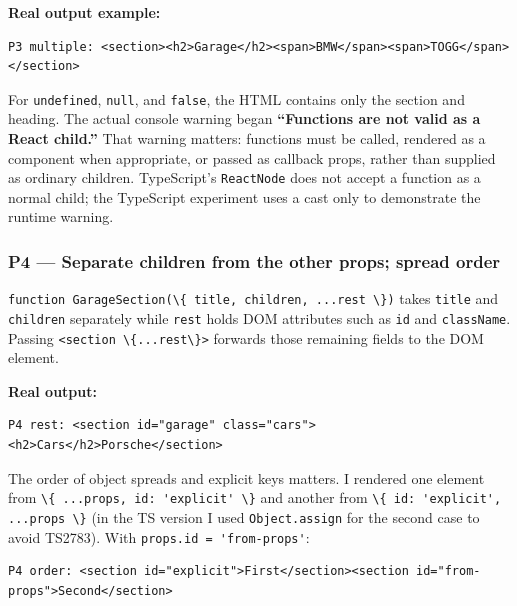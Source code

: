 \documentclass[
  9pt,
]{article}
\newcommand{\passthrough}[1]{#1}
\begin{document}
\textbf{Real output example:}

\begin{lstlisting}
P3 multiple: <section><h2>Garage</h2><span>BMW</span><span>TOGG</span></section>
\end{lstlisting}

For \passthrough{\lstinline!undefined!}, \passthrough{\lstinline!null!},
and \passthrough{\lstinline!false!}, the HTML contains only the section
and heading. The actual console warning began \textbf{``Functions are
not valid as a React child.''} That warning matters: functions must be
called, rendered as a component when appropriate, or passed as callback
props, rather than supplied as ordinary children. TypeScript's
\passthrough{\lstinline!ReactNode!} does not accept a function as a
normal child; the TypeScript experiment uses a cast only to demonstrate
the runtime warning.

\subsubsection{P4 --- Separate children from the other props; spread
order}\label{p4-separate-children-from-the-other-props-spread-order}

\passthrough{\lstinline!function GarageSection(\{ title, children, ...rest \})!}
takes \passthrough{\lstinline!title!} and
\passthrough{\lstinline!children!} separately while
\passthrough{\lstinline!rest!} holds DOM attributes such as
\passthrough{\lstinline!id!} and \passthrough{\lstinline!className!}.
Passing \passthrough{\lstinline!<section \{...rest\}>!} forwards those
remaining fields to the DOM element.

\textbf{Real output:}

\begin{lstlisting}
P4 rest: <section id="garage" class="cars"><h2>Cars</h2>Porsche</section>
\end{lstlisting}

The order of object spreads and explicit keys matters. I rendered one
element from \passthrough{\lstinline!\{ ...props, id: 'explicit' \}!}
and another from
\passthrough{\lstinline!\{ id: 'explicit', ...props \}!} (in the TS
version I used \passthrough{\lstinline!Object.assign!} for the second
case to avoid TS2783). With
\passthrough{\lstinline!props.id = 'from-props'!}:

\begin{lstlisting}
P4 order: <section id="explicit">First</section><section id="from-props">Second</section>
\end{lstlisting}
\end{document}
